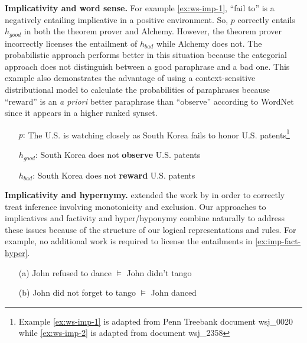 \noindent\textbf{Implicativity and word sense.}
For example \eqref{ex:ws-imp-1}, ``fail to'' is a negatively entailing
implicative in a positive environment.
So, $p$ correctly entails $h_{good}$ in both the theorem prover and Alchemy. 
However, the theorem prover incorrectly licenses the entailment of $h_{bad}$
while Alchemy does not.  
The probabilistic approach performs better in this situation because the
categorial approach does not distinguish between a good paraphrase and a
bad one.  This example also demonstrates the advantage of using a
context-sensitive distributional model to calculate the probabilities of
paraphrases because ``reward'' is an {\it a priori} better paraphrase than
``observe'' according to WordNet since it appears in a higher ranked synset. 

\begin{example}\label{ex:ws-imp-1}
\begin{itemize}
  \item[$p$:] The U.S. is watching closely as South Korea fails to honor
  U.S. patents\footnote{Example \eqref{ex:ws-imp-1} is adapted from Penn
  Treebank document wsj\_0020 while \eqref{ex:ws-imp-2} is adapted from document
  wsj\_2358}
  \item[$h_{good}$:] South Korea does not {\bf observe} U.S. patents
  \item[$h_{bad}$:] South Korea does not {\bf reward} U.S. patents
\end{itemize}
\end{example}

\noindent\textbf{Implicativity and hypernymy.}
\citet{maccartney:iwcs2009} extended the work by \citet{nairn:icos2006} in order to
correctly treat inference involving monotonicity and exclusion.  
Our approaches to implicatives and factivity and hyper/hyponymy combine naturally
to address these issues because of the structure of our logical representations
and rules.  For example, no additional work is required to license the
entailments in \eqref{ex:imp-fact-hyper}.  

\begin{example}\label{ex:imp-fact-hyper}
\begin{itemize}
  \item[(a)] John refused to dance $\vDash$ John didn't tango
  \item[(b)] John did not forget to tango $\vDash$ John danced
\end{itemize}
\end{example}


